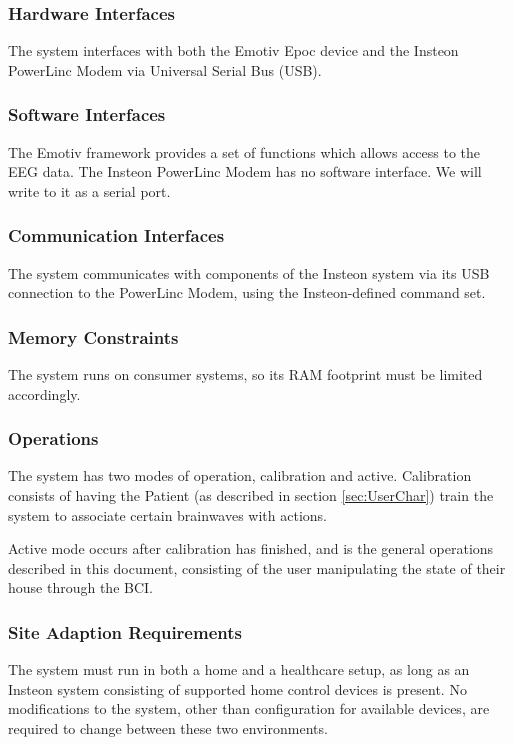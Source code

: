 \documentclass{article}
\begin{document}
\subsubsection{Hardware Interfaces}

The system interfaces with both the Emotiv Epoc device and the Insteon
PowerLinc Modem via Universal Serial Bus (USB).

\subsubsection{Software Interfaces}

The Emotiv framework provides a set of functions which allows access to the
EEG data. The Insteon PowerLinc Modem has no software interface. We will write to it as a serial port.

\subsubsection{Communication Interfaces}

The system communicates with components of the Insteon system via its USB
connection to the PowerLinc Modem, using the Insteon-defined command set.

\subsubsection{Memory Constraints}

The system runs on consumer systems, so its RAM footprint must be limited
accordingly.

\subsubsection{Operations}

The system has two modes of operation, calibration and active. Calibration
consists of having the Patient (as described in section \ref{sec:UserChar})
train the system to associate certain brainwaves with actions.

Active mode occurs after calibration has finished, and is the general
operations described in this document, consisting of the user manipulating the state of their house through the BCI.

\subsubsection{Site Adaption Requirements}
The system must run in both a home and a healthcare setup, as long as an
Insteon system consisting of supported home control devices is present. No
modifications to the system, other than configuration for available devices,
are required to change between these two environments.
\end{document}
